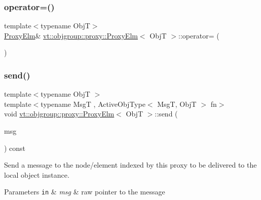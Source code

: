 \subsubsection{\texorpdfstring{operator=()}{operator=()}}
{\footnotesize\ttfamily template$<$typename ObjT$>$ \\
\hyperlink{structvt_1_1objgroup_1_1proxy_1_1_proxy_elm}{Proxy\+Elm}\& \hyperlink{structvt_1_1objgroup_1_1proxy_1_1_proxy_elm}{vt\+::objgroup\+::proxy\+::\+Proxy\+Elm}$<$ ObjT $>$\+::operator= (\begin{DoxyParamCaption}\item[{\hyperlink{structvt_1_1objgroup_1_1proxy_1_1_proxy_elm}{Proxy\+Elm}$<$ ObjT $>$ const \&}]{ }\end{DoxyParamCaption})\hspace{0.3cm}{\ttfamily [default]}}

\mbox{\label{structvt_1_1objgroup_1_1proxy_1_1_proxy_elm_a64d85f6d2721f2001e1e9ecb910e34f9}} 
\subsubsection{\texorpdfstring{send()}{send()}\hspace{0.1cm}{\footnotesize\ttfamily [1/3]}}
{\footnotesize\ttfamily template$<$typename ObjT $>$ \\
template$<$typename MsgT , Active\+Obj\+Type$<$ Msg\+T, Obj\+T $>$ fn$>$ \\
void \hyperlink{structvt_1_1objgroup_1_1proxy_1_1_proxy_elm}{vt\+::objgroup\+::proxy\+::\+Proxy\+Elm}$<$ ObjT $>$\+::send (\begin{DoxyParamCaption}\item[{MsgT $\ast$}]{msg }\end{DoxyParamCaption}) const}



Send a message to the node/element indexed by this proxy to be delivered to the local object instance. 


\begin{DoxyParams}[1]{Parameters}
\mbox{\tt in}  & {\em msg} & raw pointer to the message \\
\hline
\end{DoxyParams}
\mbox{\label{structvt_1_1objgroup_1_1proxy_1_1_proxy_elm_ab3d1751dac7c003cd13306277c164247}} 
